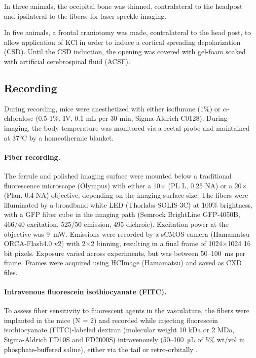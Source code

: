 In three animals, the occipital bone 
was thinned, contralateral to the headpost and ipsilateral to the 
fibers, for laser speckle imaging.

In five animals, a frontal craniotomy was made, contralateral to 
the head post, to allow application of KCl in order to induce a 
cortical spreading depolarization (CSD). Until the CSD induction, the 
opening was covered with gel-foam soaked with artificial 
cerebrospinal fluid (ACSF).

\subsection{Recording}

During recording, mice were anesthetized with either isoflurane (1\%) 
or $\alpha$-chloralose (0.5-1\%, IV, 0.1 \si{\milli\liter} per 30 min, 
Sigma-Aldrich C0128). During imaging, the body 
temperature was monitored via a rectal probe and maintained at 
37\si{\celsius} by a homeothermic blanket.


\paragraph{Fiber recording.} The ferrule and polished imaging surface were mounted
 below a traditional fluorescence microscope (Olympus) with either a 
10$\times$ (PL L, 0.25 NA) or a 20$\times$ (Plan, 0.4 NA) objective, 
depending on the imaging surface size. The fibers were illuminated by 
a broadband white LED (Thorlabs SOLIS-3C) at 100\% brightness, with a 
GFP filter cube in the imaging path (Semrock BrightLine GFP-4050B, 
466/40 excitation, 525/50 emission, 495 dichroic). Excitation power at
 the objective was 9~\si{\milli\watt}. Emissions were recorded by a 
sCMOS camera (Hamamatsu ORCA-Flash4.0 v2) with 2$\times$2 binning, 
resulting in a final frame of 1024$\times$1024 16 bit pixels. Exposure
 varied across experiments, but was between 50--100~ms per frame. 
Frames were acquired using HCImage (Hamamatsu) and saved as CXD files.



\paragraph{Intravenous fluorescein isothiocyanate (FITC).} To assess fiber sensitivity to 
fluorescent agents in the vasculature, the fibers were implanted in 
the mice (N = 2) and recorded while injecting fluorescein 
isothiocyanate (FITC)-labeled dextran (molecular weight 10 kDa or 2 
MDa, Sigma-Aldrich FD10S and FD2000S) intravenously 
(50--100~\si{\micro\liter} of 5\% wt/vol in phosphate-buffered 
saline), either via the tail or retro-orbitally \cite{Yardeni:2011fs}.



